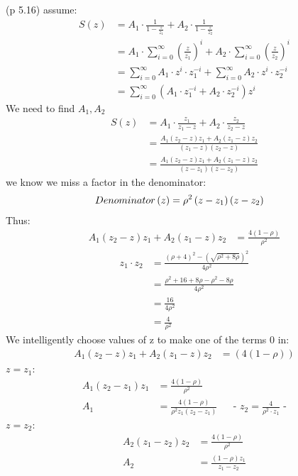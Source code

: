 (p 5.16) assume:
\begin{align*}
S\left(z\right)&=A_{1}\cdot \frac{1}{1-\frac{z}{z_{1}}}+A_{2}\cdot \frac{1}{1-\frac{z}{z_{2}}}\\
&=A_{1}\cdot \sum _{{i=0}}^{\infty }\left(\frac{z}{z_{1}}\right)^{i}+A_{2}\cdot \sum _{{i=0}}^{\infty }\left(\frac{z}{z_{2}}\right)^{i}\\
&=\sum_{i=0}^{\infty } A_{1} \cdot z^i \cdot z_1^{-i}+\sum_{i=0}^{\infty } A_2 \cdot z^i \cdot z_2^{-i}\\
&=\sum_{{i=0}}^{\infty }\left(A_{1}\cdot z_{1}^{{-i}}+A_{2}\cdot z_{2}^{{-i}}\right)z^{i}
\end{align*}
We need to find $A_{1},A_{2}$
\begin{align*}
S\left(z\right)&=A_{1}\cdot \frac{z_{1}}{z_{1}-z}+A_{2}\cdot \frac{z_{2}}{z_{2}-z}\\
&=\frac{A_{1}\left(z_{2}-z\right)z_{1}+A_{2}\left(z_{1}-z\right)z_{2}}{\left(z_{1}-z\right)\left(z_{2}-z\right)}\\
&=\frac{A_{1}\left(z_{2}-z\right)z_{1}+A_{2}\left(z_{1}-z\right)z_{2}}{\left(z-z_{1}\right)\left(z-z_{2}\right)}
\end{align*}
we know we miss a factor in the denominator:
\begin{align*}
Denominator\left(z\right)&={\bf \rho} ^{2} \left(z-z_{1}\right)\left(z-z_{2}\right)
\end{align*}
Thus:
\begin{align*}
A_{1}\left(z_{2}-z\right)z_{1}+A_{2}\left(z_{1}-z\right)z_{2}&=\frac{4\left(1-\rho \right)}{\rho ^{2}}
\end{align*}
\begin{align*}
z_{1}\cdot z_{2}&=\frac{\left(\rho +4\right)^{2}-\left(\sqrt{\rho ^{2}+8\rho }\right)^{2}}{4\rho ^{2}}\\
&=\frac{\rho ^{2}+16+8\rho -\rho ^{2}-8\rho }{4\rho ^{2}}\\
&=\frac{16}{4\rho ^{2}}\\
&=\frac{4}{\rho ^{2}}
\end{align*}
We intelligently choose values of z to make one of the terms 0 in:
\begin{align*}
A_{1}\left(z_{2}-z\right)z_{1}+A_{2}\left(z_{1}-z\right)z_{2}&=\left(4\left(1-\rho \right)\right)
\end{align*}
$z=z_{1}$:
\begin{align*}
A_{1}\left(z_{2}-z_{1}\right)z_{1}&=\frac{4\left(1-\rho \right)}{\rho ^{2}}\\
A_{1}&=\frac{4\left(1-\rho \right)}{\rho ^{2}z_{1}\left(z_{2}-z_{1}\right)}&& \text{-  $z_{2}=\frac{4}{\rho ^{2}\cdot z_{1}}$ -}
\end{align*}
$z=z_{2}$:
\begin{align*}
A_{2}\left(z_{1}-z_{2}\right)z_{2}&=\frac{4\left(1-\rho \right)}{\rho ^{2}}\\
A_{2}&=\frac{\left(1-\rho \right)z_{1}}{z_{1}-z_{2}}
\end{align*}

